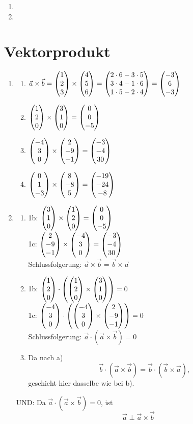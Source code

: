 \begin{enumerate}
		\item %
		
		\item %
	\end{enumerate}
	
\section{Vektorprodukt}
	\begin{enumerate}
\item
	\begin{enumerate}
		\item $\vec{a} \times \vec{b} = \begin{pmatrix} 1 \\ 2 \\ 3 \end{pmatrix}\times\begin{pmatrix} 4 \\ 5 \\ 6 \end{pmatrix}=\begin{pmatrix} 2 \cdot 6 - 3 \cdot 5 \\ 3 \cdot 4 - 1 \cdot 6 \\ 1 \cdot 5 - 2 \cdot 4 \end{pmatrix} =\begin{pmatrix} -3 \\ 6 \\ -3 \end{pmatrix}$
		\item $\begin{pmatrix} 1 \\ 2 \\ 0 \end{pmatrix}\times\begin{pmatrix} 3 \\ 1 \\ 0 \end{pmatrix}=\begin{pmatrix} 0 \\ 0 \\ -5 \end{pmatrix}$
		\item $\begin{pmatrix} -4 \\ 3 \\ 0 \end{pmatrix}\times\begin{pmatrix} 2 \\ -9 \\ -1 \end{pmatrix}=\begin{pmatrix} -3 \\ -4 \\ 30 \end{pmatrix}$
		\item $\begin{pmatrix} 0 \\ 1 \\ -3 \end{pmatrix}\times\begin{pmatrix} 8 \\ -8 \\ 5 \end{pmatrix}= \begin{pmatrix} -19 \\ -24 \\ -8 \end{pmatrix}$
	\end{enumerate}

\item
	\begin{enumerate}
		\item 1b:	$\begin{pmatrix} 3 \\ 1 \\ 0 \end{pmatrix}\times\begin{pmatrix} 1 \\ 2 \\ 0 \end{pmatrix}=\begin{pmatrix} 0 \\ 0 \\ -5 \end{pmatrix}$\\
			  1c:	$\begin{pmatrix} 2 \\ -9 \\ -1 \end{pmatrix}\times\begin{pmatrix} -4 \\ 3 \\ 0 \end{pmatrix}=\begin{pmatrix} -3 \\ -4 \\ 30 \end{pmatrix}$\\
			  Schlussfolgerung: $\vec{a}\times\vec{b}=\vec{b}\times\vec{a}$\bigskip
		\item 1b:	$\begin{pmatrix} 1 \\ 2 \\ 0 \end{pmatrix}\cdot\left(\begin{pmatrix} 1 \\ 2 \\ 0 \end{pmatrix}\times\begin{pmatrix} 3 \\ 1 \\ 0 \end{pmatrix}\right)=0$\\
			  1c:	$\begin{pmatrix} -4 \\ 3 \\ 0 \end{pmatrix}\cdot\left(\begin{pmatrix} -4 \\ 3 \\ 0 \end{pmatrix}\times\begin{pmatrix} 2 \\ -9 \\ -1 \end{pmatrix}\right)=0$\\
			  Schlussfolgerung: $\vec{a}\cdot(\vec{a}\times\vec{b})=0$\bigskip
		\item Da nach a) $$\vec{b}\cdot(\vec{a}\times\vec{b})=\vec{b}\cdot(\vec{b}\times\vec{a}),$$ geschieht hier dasselbe wie bei b).\\		
	\end{enumerate}
	UND: Da $\vec{a}\cdot(\vec{a}\times\vec{b})=0$, ist $$\vec{a}\perp\vec{a}\times\vec{b}$$
	
\end{enumerate}

